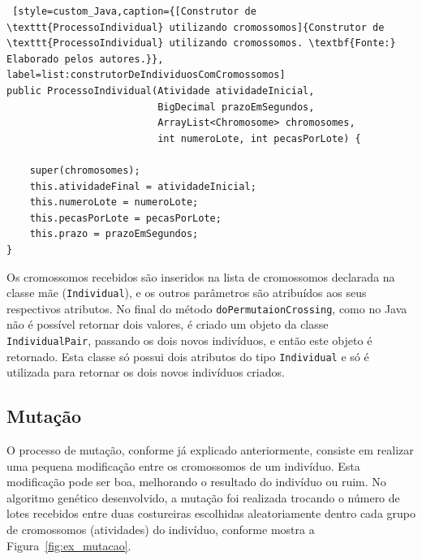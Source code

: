 \begin{lstlisting} [style=custom_Java,caption={[Construtor de \texttt{ProcessoIndividual} utilizando cromossomos]{Construtor de \texttt{ProcessoIndividual} utilizando cromossomos. \textbf{Fonte:} Elaborado pelos autores.}}, label=list:construtorDeIndividuosComCromossomos] 
public ProcessoIndividual(Atividade atividadeInicial, 
						  BigDecimal prazoEmSegundos, 
						  ArrayList<Chromosome> chromosomes, 
						  int numeroLote, int pecasPorLote) {

	super(chromosomes);
	this.atividadeFinal = atividadeInicial;
	this.numeroLote = numeroLote;
	this.pecasPorLote = pecasPorLote;
	this.prazo = prazoEmSegundos;
}

\end{lstlisting}
\par Os cromossomos recebidos são inseridos na lista de cromossomos declarada na classe mãe (\texttt{Individual}), e os 
outros parâmetros são atribuídos aos seus respectivos atributos. No final do método \texttt{doPermutaionCrossing}, como no 
Java não é possível retornar dois valores, é criado um objeto da classe \texttt{IndividualPair}, passando os dois novos indivíduos, 
e então este objeto é retornado. Esta classe só possui dois atributos do tipo \texttt{Individual} e só é utilizada para retornar os dois 
novos indivíduos criados.

\subsection{Mutação} \label{mutacao_subsection}
\par O processo de mutação, conforme já explicado anteriormente, consiste em realizar uma pequena modificação entre os cromossomos
de um indivíduo. Esta modificação pode ser boa, melhorando o resultado do indivíduo ou ruim. No algoritmo genético desenvolvido, 
a mutação foi realizada trocando o número de lotes recebidos entre duas costureiras escolhidas aleatoriamente dentro cada grupo de cromossomos (atividades) do indivíduo, conforme mostra a Figura~\ref{fig:ex_mutacao}.

